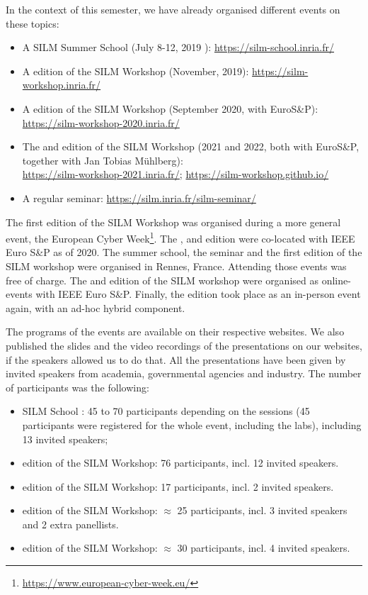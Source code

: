 \documentclass[a4paper,11pt]{article}
\begin{document}
In the context of this semester, we have already organised different events
on these topics:
%
\begin{itemize}
%
    \item A SILM Summer School (July 8-12, 2019 ):
\url{https://silm-school.inria.fr/}
%
    \item A  edition of the SILM Workshop (November, 2019):
\url{https://silm-workshop.inria.fr/}
%
    \item A  edition of the SILM Workshop (September 2020, with
EuroS\&P): \\ \url{https://silm-workshop-2020.inria.fr/}
%
    \item The  and  edition of the SILM Workshop (2021 and
2022, both with EuroS\&P, together with Jan Tobias M\"uhlberg): \\
\url{https://silm-workshop-2021.inria.fr/};
\url{https://silm-workshop.github.io/}
%
    \item A regular seminar: \url{https://silm.inria.fr/silm-seminar/}
%
\end{itemize}

The first edition of the SILM Workshop was organised during a more general
event, the European Cyber
Week\footnote{\url{https://www.european-cyber-week.eu/}}.  The ,
 and  edition were co-located with IEEE Euro S\&P as of 2020. 
% 
The summer school, the seminar and the first edition of the SILM workshop
were organised in Rennes, France. Attending those events was free of
charge. The  and  edition of the SILM workshop were organised
as online-events with IEEE Euro S\&P. Finally, the  edition took
place as an in-person event again, with an ad-hoc hybrid component.

The programs of the events are available on their respective websites. We
also published the slides and the video recordings of the presentations on
our websites, if the speakers allowed us to do that. All the presentations
have been given by invited speakers from academia, governmental agencies
and industry. The number of participants was the following:
%
\begin{itemize}
%
    \item SILM School : 45 to 70 participants depending on the sessions (45
participants were registered for the whole event, including the labs),
including 13 invited speakers;
%
    \item {} edition of the SILM Workshop: 76 participants, incl.
12 invited speakers.
%
    \item {} edition of the SILM Workshop: 17 participants, incl.
2 invited speakers.
%
    \item {} edition of the SILM Workshop: $\approx$ 25 participants,
incl. 3 invited speakers and 2 extra panellists.
%
    \item {} edition of the SILM Workshop: $\approx$ 30 participants,
incl. 4 invited speakers.
%
\end{itemize}
\end{document}
